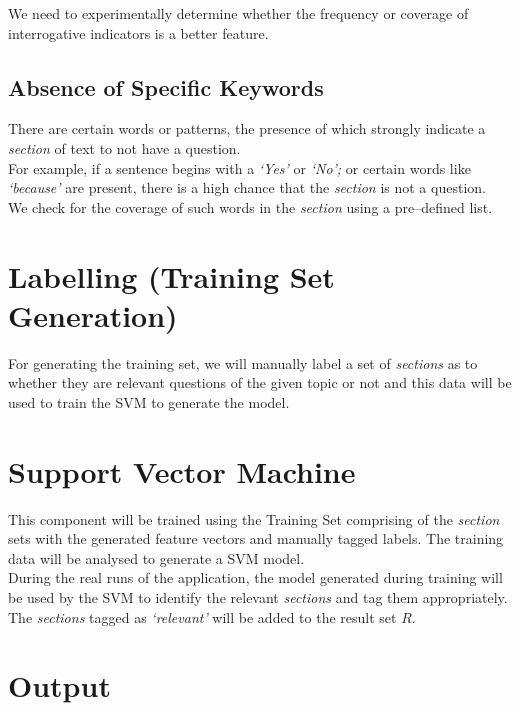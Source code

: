 \documentclass[a4paper,10pt]{report}
\begin{document}
\noindent We need to experimentally determine whether the frequency or coverage of interrogative indicators is a better feature.

\subsection {Absence of Specific Keywords}

There are certain words or patterns, the presence of which strongly indicate a \emph{section} of text to not have a question. \\

\noindent For example, if a sentence begins with a \emph{`Yes'} or \emph{`No';} or certain words like \emph{`because'} are present, there is a high chance that the \emph{section} is not a question. \\

\noindent We check for the coverage of such words in the \emph{section} using a pre--defined list. 
\clearpage
\section{Labelling (Training Set Generation)}

For generating the training set, we will manually label a set of \emph{sections} as to whether they are relevant questions of the given topic or not and this data will be used to train the SVM to generate the model. 

\section{Support Vector Machine}

This component will be trained using the Training Set comprising of the \emph{section} sets with the generated feature vectors and manually tagged labels. The training data will be analysed to generate a SVM model. \\

\noindent During the real runs of the application, the model generated during training will be used by the SVM to identify the relevant \emph{sections} and tag them appropriately. \\

\noindent The \emph{sections} tagged as \emph{`relevant'} will be added to the result set $R$.

\section{Output}
\end{document}
